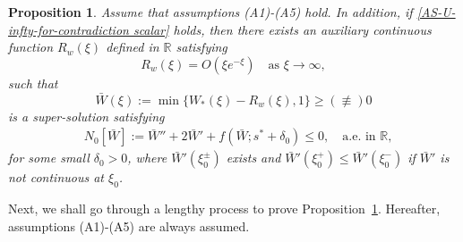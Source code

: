 \documentclass[11pt,a4paper]{article}
\newtheorem{proposition}[theorem]{\textbf{Proposition}}
\numberwithin{equation}{section}
\numberwithin{figure}{section}
\newcommand{\red}[1]{{\color{red}#1}}
\newcommand{\blue}[1]{{\color{blue}#1}}
\newcommand\bea{\begin{eqnarray}}
\newcommand\eea{\end{eqnarray}}
\begin{document}
\begin{proposition}\label{Prop-supersol}
Assume that assumptions (A1)-(A5) hold. In addition, if \eqref{AS-U-infty-for-contradiction scalar} holds,
then there exists an auxiliary continuous function $R_w(\xi)$ defined in $\mathbb{R}$ satisfying
\begin{equation}\label{decay rate of Rw}
R_w(\xi)=O(\xi e^{-\xi}) \quad \mbox{as $\xi\to\infty$},
\end{equation}
such that 
$$\bar{W}(\xi):=\min\{W_{*}(\xi)-R_w(\xi),1\}\geq (\not\equiv) 0$$
is a super-solution
satisfying
\bea\label{tw super solution scalar}
&N_0[\bar W]:=\bar W''+2\bar W'+f(\bar W;s^*+\delta_0)\le0,\quad  \mbox{a.e. in $\mathbb{R}$},
\eea
for some small $\delta_0>0$,
where ${\bar W}'(\xi_0^{\pm})$ exists and
${\bar W}'(\xi_0^+)\leq {\bar W}'(\xi_0^-)$
if $\bar W'$ is not continuous at $\xi_0$.

\end{proposition}

Next, we shall go through a lengthy process to prove Proposition~\ref{Prop-supersol}.
Hereafter, assumptions (A1)-(A5) are always assumed.

\end{document}
